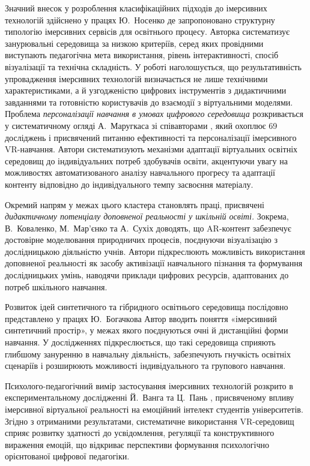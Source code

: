 Значний внесок у розроблення класифікаційних підходів до імерсивних технологій здійснено у працях Ю.~Носенко \cite{Nosenko2024Typology} де запропоновано структурну типологію імерсивних сервісів для освітнього процесу. Авторка систематизує занурювальні середовища за низкою критеріїв, серед яких провідними виступають педагогічна мета використання, рівень інтерактивності, спосіб візуалізації та технічна складність. У роботі наголошується, що результативність упровадження імерсивних технологій визначається не лише технічними характеристиками, а й узгодженістю цифрових інструментів з дидактичними завданнями та готовністю користувачів до взаємодії з віртуальними моделями. Проблема \emph{персоналізації навчання в умовах цифрового середовища} розкривається у систематичному огляді А.~Маругкаса зі співавторами \cite{Gurska2025Personalized}, який охоплює 69 досліджень і присвячений питанню ефективності та персоналізації імерсивного VR-навчання. Автори систематизують механізми адаптації віртуальних освітніх середовищ до індивідуальних потреб здобувачів освіти, акцентуючи увагу на можливостях автоматизованого аналізу навчального прогресу та адаптації контенту відповідно до індивідуального темпу засвоєння матеріалу.

Окремий напрям у межах цього кластера становлять праці, присвячені \emph{дидактичному потенціалу доповненої реальності у шкільній освіті.} Зокрема, В.~Коваленко, М.~Мар'єнко та А.~Сухіх \cite{Pinchuk2022AR} доводять, що AR-контент забезпечує достовірне моделювання природничих процесів, поєднуючи візуалізацію з дослідницькою діяльністю учнів. Автори підкреслюють можливість використання доповненої реальності як засобу активізації навчального пізнання та формування дослідницьких умінь, наводячи приклади цифрових ресурсів, адаптованих до потреб шкільного навчання.

Розвиток ідей синтетичного та гібридного освітнього середовища послідовно представлено у працях Ю.~Богачкова \cite{Bogachkov2023Immersive} Автор вводить поняття «імерсивний синтетичний простір», у межах якого поєднуються очні й дистанційні форми навчання. У дослідженнях підкреслюється, що такі середовища сприяють глибшому зануренню в навчальну діяльність, забезпечують гнучкість освітніх сценаріїв і розширюють можливості індивідуального та групового навчання.

Психолого-педагогічний вимір застосування імерсивних технологій розкрито в експериментальному дослідженні Й.~Ванга та Ц.~Пань \cite{Lytvynova2025Emotional}, присвяченому впливу імерсивної віртуальної реальності на емоційний інтелект студентів університетів. Згідно з отриманими результатами, систематичне використання VR-середовищ сприяє розвитку здатності до усвідомлення, регуляції та конструктивного вираження емоцій, що відкриває перспективи формування психологічно орієнтованої цифрової педагогіки.


